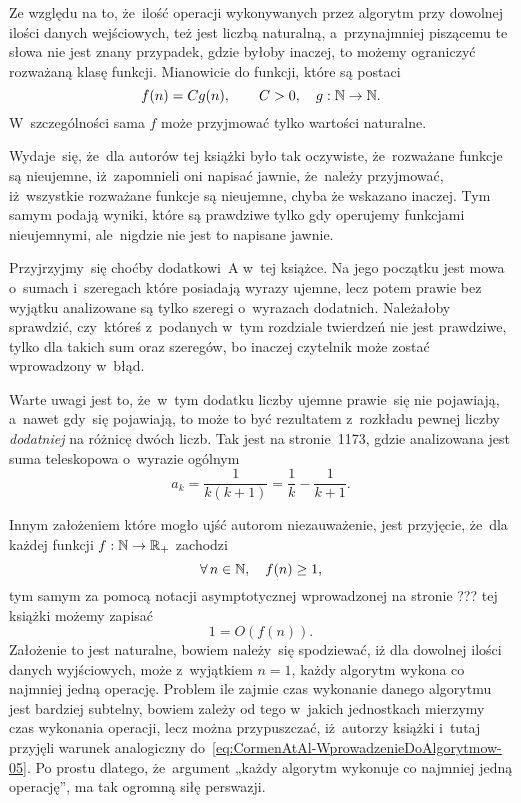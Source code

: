 \documentclass[a4paper,11pt]{article}
\begin{document}
Ze względu na to, że~ilość operacji wykonywanych przez algorytm przy
dowolnej ilości danych wejściowych, też jest liczbą naturalną,
a~przynajmniej piszącemu te słowa nie jest znany
przypadek, gdzie byłoby inaczej, to możemy ograniczyć rozważaną klasę
funkcji. Mianowicie do funkcji, które są postaci
\begin{equation}
  \label{eq:CormenAtAl-WprowadzenieDoAlgorytmow-03}
  f( n ) = C g( n ), \qquad
  C > 0, \quad
  g : \mathbb{N} \to \mathbb{N}.
\end{equation}
W~szczególności sama $f$ może przyjmować tylko wartości naturalne.

Wydaje~się, że~dla autorów tej książki było tak oczywiste, że~rozważane
funkcje są nieujemne, iż~zapomnieli oni napisać jawnie, że~należy przyjmować,
iż~wszystkie rozważane funkcje są nieujemne, chyba że wskazano inaczej. Tym
samym podają wyniki, które są prawdziwe tylko gdy operujemy funkcjami
nieujemnymi, ale~nigdzie nie jest to napisane jawnie.

Przyjrzyjmy~się choćby dodatkowi~A w~tej książce. Na jego początku jest mowa
o~sumach i~szeregach które posiadają wyrazy ujemne, lecz potem prawie bez
wyjątku analizowane są tylko szeregi o~wyrazach dodatnich. Należałoby
sprawdzić, czy~któreś z~podanych w~tym rozdziale twierdzeń nie jest
prawdziwe, tylko dla takich sum oraz szeregów, bo inaczej czytelnik może
zostać wprowadzony w~błąd.

Warte uwagi jest to, że~w~tym dodatku liczby ujemne prawie~się nie
pojawiają, a~nawet gdy~się pojawiają, to może to być rezultatem z~rozkładu
pewnej liczby \textit{dodatniej} na różnicę dwóch liczb. Tak jest na
stronie~1173, gdzie analizowana jest suma teleskopowa o~wyrazie ogólnym
\begin{equation}
  \label{eq:CormenAtAl-WprowadzenieDoAlgorytmow-04}
  a_{ k } = \frac{ 1 }{ k ( k + 1 ) } =
  \frac{ 1 }{ k } - \frac{ 1 }{ k + 1 }.
\end{equation}

Innym założeniem które mogło ujść autorom niezauważenie, jest przyjęcie,
że~dla każdej funkcji $f : \mathbb{N} \to \mathbb{R}_{ + }$ zachodzi
\begin{equation}
  \label{eq:CormenAtAl-WprowadzenieDoAlgorytmow-05}
  \forall \, n \in \mathbb{N}, \quad
  f( n ) \geq 1,
\end{equation}
tym samym za pomocą notacji asymptotycznej wprowadzonej na stronie ??? tej
książki możemy zapisać
\begin{equation}
  \label{eq:CormenAtAl-WprowadzenieDoAlgorytmow-06}
  1 = O\left( f( n ) \right).
\end{equation}
Założenie to jest naturalne, bowiem należy~się spodziewać, iż dla dowolnej
ilości danych wyjściowych, może z~wyjątkiem $n = 1$, każdy algorytm wykona
co najmniej jedną operację. Problem ile zajmie czas wykonanie danego
algorytmu jest bardziej subtelny, bowiem zależy od tego w~jakich jednostkach
mierzymy czas wykonania operacji, lecz można przypuszczać, iż~autorzy
książki i~tutaj przyjęli warunek analogiczny
do~\eqref{eq:CormenAtAl-WprowadzenieDoAlgorytmow-05}. Po prostu dlatego,
że~argument „każdy algorytm wykonuje co najmniej jedną operację”, ma tak
ogromną siłę perswazji.
\end{document}
